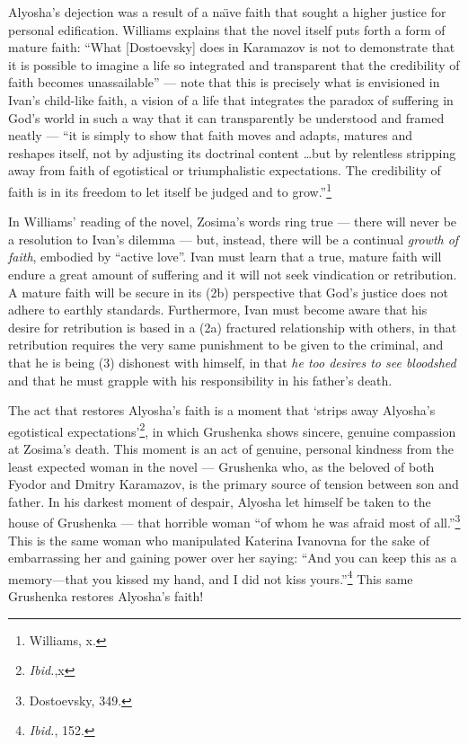 Alyosha's dejection was a result of a na\"{\i}ve faith that sought a higher justice for personal edification. Williams explains that the novel itself puts forth a form of mature faith: ``What [Dostoevsky] does in Karamazov is not to demonstrate that it is possible to imagine a life so integrated and transparent that the credibility of faith becomes unassailable'' --- note that this is precisely what is envisioned in Ivan's child-like faith, a vision of a life that integrates the paradox of suffering in God's world in such a way that it can transparently be understood and framed neatly --- ``it is simply to show that faith moves and adapts, matures and reshapes itself, not by adjusting its doctrinal content \ldots but by relentless stripping away from faith of egotistical or triumphalistic expectations. The credibility of faith is in its freedom to let itself be judged and to grow.''\footnote{Williams, x.}

In Williams' reading of the novel, Zosima's words ring true --- there will never be a resolution to Ivan's dilemma --- but, instead, there will be a continual \emph{growth of faith}, embodied by ``active love''. Ivan must learn that a true, mature faith will endure a great amount of suffering and it will not seek vindication or retribution. A mature faith will be secure in its (2b) perspective that God's justice does not adhere to earthly standards. Furthermore, Ivan must become aware that his desire for retribution is based in a (2a) fractured relationship with others, in that retribution requires the very same punishment to be given to the criminal, and that he is being (3) dishonest with himself, in that \emph{he too desires to see bloodshed} and that he must grapple with his responsibility in his father's death. 

The act that restores Alyosha's faith is a moment that `strips away Alyosha's egotistical expectations'\footnote{\emph{Ibid.},x}, in which Grushenka shows sincere, genuine compassion at Zosima's death. This moment is an act of genuine, personal kindness from the least expected woman in the novel --- Grushenka who, as the beloved of both Fyodor and Dmitry Karamazov, is the primary source of tension between son and father. In his darkest moment of despair, Alyosha let himself be taken to the house of Grushenka --- that horrible woman ``of whom he was afraid most of all.''\footnote{Dostoevsky, 349.} This is the same woman who manipulated Katerina Ivanovna for the sake of embarrassing her and gaining power over her saying: ``And you can keep this as a memory---that you kissed my hand, and I did not kiss yours.''\footnote{\emph{Ibid.}, 152.} This same Grushenka restores Alyosha's faith!

